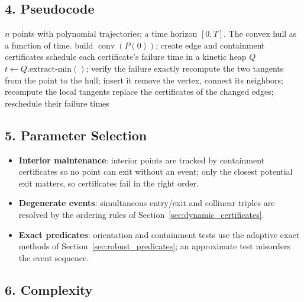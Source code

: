 \subsection{4. Pseudocode}

\begin{algorithm}[htbp]
\caption{Kinetic Convex Hull}
\label{alg:kinetic_convex_hull}
\begin{algorithmic}[1]
\Require $n$ points with polynomial trajectories; a time horizon $[0, T]$.
\Ensure The convex hull as a function of time.
  \State build $\operatorname{conv}(P(0))$; create edge and containment certificates
  \State schedule each certificate's failure time in a kinetic heap $Q$
    \State $t \gets Q.\text{extract-min}()$; verify the failure exactly
      \State recompute the two tangents from the point to the hull; insert it
      \State remove the vertex, connect its neighbors; recompute the local tangents
    \EndIf
    \State replace the certificates of the changed edges; reschedule their failure times
  \EndWhile
\EndFunction
\end{algorithmic}
\end{algorithm}

\subsection{5. Parameter Selection}

\begin{itemize}
  \item \textbf{Interior maintenance}: interior points are tracked by
    containment certificates so no point can exit without an event; only the
    closest potential exit matters, so certificates fail in the right order.
  \item \textbf{Degenerate events}: simultaneous entry/exit and collinear
    triples are resolved by the ordering rules of
    Section~\ref{sec:dynamic_certificates}.
  \item \textbf{Exact predicates}: orientation and containment tests use the
    adaptive exact methods of Section~\ref{sec:robust_predicates}; an
    approximate test misorders the event sequence.
\end{itemize}

\subsection{6. Complexity}


